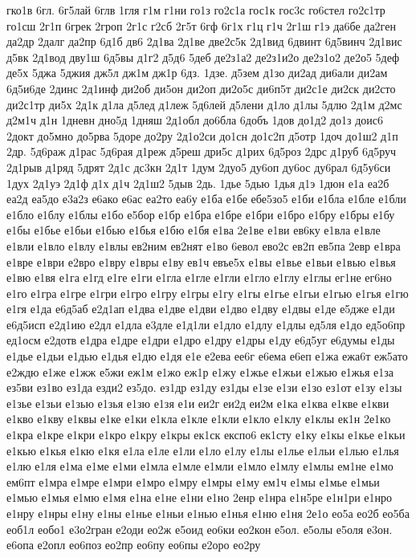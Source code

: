 {гко1в
6гл.
6г5лай
6глв
1гля
г1м
г1ни
го1з
го2с1а
гос1к
гос3с
го6стел
го2с1тр
го1сш
2г1п
6грек
2гроп
2г1с
г2сб
2г5т
6гф
6г1х
г1ц
г1ч
2г1ш
г1э
да6бе
да2ген
да2др
2далг
да2пр
6д1б
дв6
2д1ва
2д1ве
две2с5к
2д1вид
6двинт
6д5винч
2д1вис
д5вк
2д1вод
дву1ш
6д5вы
д1г2
д5д6
5деб
де2з1а2
де2з1и2о
де2з1о2
де2о5
5деф
де5х
5джа
5джия
дж5л
дж1м
дж1р
6дз.
1дзе.
д5зем
д1зо
ди2ад
ди6али
ди2ам
6д5и6де
2динс
2д1инф
ди2об
ди5он
ди2оп
ди2о5с
ди6п5т
ди2с1е
ди2ск
ди2сто
ди2с1тр
ди5х
2д1к
д1ла
д5лед
д1леж
5д6лей
д5лени
д1ло
д1лы
5длю
2д1м
д2мс
д2м1ч
д1н
1дневн
дно5д
1дняш
2д1обл
до6бла
6добъ
1дов
до1д2
до1з
доис6
2докт
до5мно
до5рва
5доре
до2ру
2д1о2си
до1сн
до1с2п
д5отр
1доч
до1ш2
д1п
2др.
5д6раж
д1рас
5д6рая
д1реж
д5реш
дри5с
д1рих
6д5роз
2дрс
д1руб
6д5руч
2д1рыв
д1ряд
5дрят
2д1с
дс3кн
2д1т
1дум
2дуо5
ду6оп
ду6ос
ду6рал
6д5у6си
1дух
2д1уэ
2д1ф
д1х
д1ч
2д1ш2
5дыв
2дь.
1дье
5дью
1дья
д1э
1дюн
е1а
еа2б
еа2д
еа5до
е3а2з
е6ако
е6ас
еа2то
еа6у
е1ба
е1бе
ебе5зо5
е1би
е1бла
е1бле
е1бли
е1бло
е1блу
е1блы
е1бо
е5бор
е1бр
е1бра
е1бре
е1бри
е1бро
е1бру
е1бры
е1бу
е1бы
е1бье
е1бьи
е1бью
е1бья
е1бю
е1бя
е1ва
2е1ве
е1ви
ев6ку
е1вла
е1вле
е1вли
е1вло
е1влу
е1влы
ев2ним
ев2нят
е1во
6евол
ево2с
ев2п
ев5па
2евр
е1вра
е1вре
е1ври
е2вро
е1вру
е1вры
е1ву
ев1ч
евъе5х
е1вы
е1вье
е1вьи
е1вью
е1вья
е1вю
е1вя
е1га
е1гд
е1ге
е1ги
е1гла
е1гле
е1гли
е1гло
е1глу
е1глы
ег1не
ег6но
е1го
е1гра
е1гре
е1гри
е1гро
е1гру
е1гры
е1гу
е1гы
е1гье
е1гьи
е1гью
е1гья
е1гю
е1гя
е1да
е6д5аб
е2д1ап
е1два
е1две
е1дви
е1дво
е1дву
е1двы
е1де
е5дже
е1ди
е6д5исп
е2д1ию
е2дл
е1дла
е3дле
е1д1ли
е1дло
е1длу
е1длы
ед5ля
е1до
ед5о6пр
ед1осм
е2дотв
е1дра
е1дре
е1дри
е1дро
е1дру
е1дры
е1ду
е6д5уг
е6думы
е1ды
е1дье
е1дьи
е1дью
е1дья
е1дю
е1дя
е1е
е2ева
ее6г
е6ема
е6еп
е1жа
ежа6т
еж5ато
е2ждю
е1же
е1жж
е5жи
еж1м
е1жо
еж1р
е1жу
е1жье
е1жьи
е1жью
е1жья
е1за
ез5ви
ез1во
ез1да
езди2
ез5до.
ез1др
ез1ду
ез1ды
е1зе
е1зи
е1зо
ез1от
е1зу
е1зы
е1зье
е1зьи
е1зью
е1зья
е1зю
е1зя
е1и
еи2г
еи2д
еи2м
е1ка
е1ква
е1кве
е1кви
е1кво
е1кву
е1квы
е1ке
е1ки
е1кла
е1кле
е1кли
е1кло
е1клу
е1клы
ек1н
2е1ко
е1кра
е1кре
е1кри
е1кро
е1кру
е1кры
ек1ск
експо6
ек1сту
е1ку
е1кы
е1кье
е1кьи
е1кью
е1кья
е1кю
е1кя
е1ла
е1ле
е1ли
е1ло
е1лу
е1лы
е1лье
е1льи
е1лью
е1лья
е1лю
е1ля
е1ма
е1ме
е1ми
е1мла
е1мле
е1мли
е1мло
е1млу
е1млы
ем1не
е1мо
ем6пт
е1мра
е1мре
е1мри
е1мро
е1мру
е1мры
е1му
ем1ч
е1мы
е1мье
е1мьи
е1мью
е1мья
е1мю
е1мя
е1на
е1не
е1ни
е1но
2енр
е1нра
е1н5ре
е1н1ри
е1нро
е1нру
е1нры
е1ну
е1ны
е1нье
е1ньи
е1нью
е1нья
е1ню
е1ня
2е1о
ео5а
ео2б
ео5ба
еоб1л
еобо1
е3о2гран
е2оди
ео2ж
е5оид
ео6ки
ео2кон
е5ол.
е5олы
е5оля
е3он.
е6опа
е2опл
ео6поз
ео2пр
ео6пу
ео6пы
е2оро
ео2ру
}
